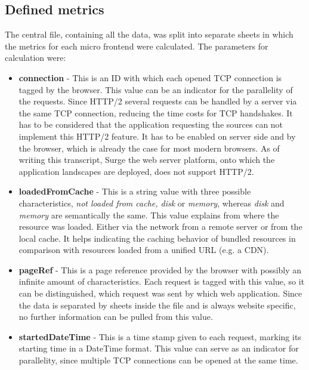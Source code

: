 \subsection{Defined metrics}

The central file, containing all the data, was split into separate sheets in which the metrics for each micro frontend were calculated. The parameters for calculation were:

\begin{itemize}
	\item \textbf{connection} - This is an ID with which each opened TCP connection is tagged by the browser. This value can be an indicator for the parallelity of the requests. Since HTTP/2 several requests can be handled by a server via the same TCP connection, reducing the time costs for TCP handshakes. It has to be considered that the application requesting the sources can not implement this HTTP/2 feature. It has to be enabled on server side and by the browser, which is already the case for most modern browsers.\cite{http2} As of writing this transcript, Surge the web server platform, onto which the application landscapes are deployed, does not support HTTP/2.
	
	\item \textbf{loadedFromCache} - This is a string value with three possible characteristics, \textit{not loaded from cache, disk} or \textit{memory}, whereas \textit{disk} and \textit{memory} are semantically the same. This value explains from where the resource was loaded. Either via the network from a remote server or from the local cache. It helps indicating the caching behavior of bundled resources in comparison with resources loaded from a unified URL (e.g. a CDN). 
	
	\item \textbf{pageRef} - This is a page reference provided by the browser with possibly an infinite amount of characteristics. Each request is tagged with this value, so it can be distinguished, which request was sent by which web application. Since the data is separated by sheets inside the file and is always website specific, no further information can be pulled from this value.
	
	\item \textbf{startedDateTime} - This is a time stamp given to each request, marking its starting time in a DateTime format. This value can serve as an indicator for parallelity, since multiple TCP connections can be opened at the same time. 
	

\end{itemize}
